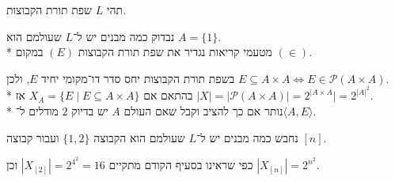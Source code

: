 \question{}
תהי $L$ שפת תורת הקבוצות.

\subquestion{}
נבדוק כמה מבנים יש ל־$L$ שעולמם הוא $A = \{1\}$. \\*
מטעמי קריאות נגדיר את שפת תורת הקבוצות $(E)$ במקום $(\in)$.
\begin{solution}
	בשפת תורת הקבוצות יחס סדר דו־מקומי יחיד $E$, ולכן $E \subseteq A \times A \iff E \in \mathcal{P}(A \times A)$. \\*
בהתאם אם $X_A = \{ E \mid E \subseteq A \times A \}$ אז $|X| = |\mathcal{P}(A \times A)| = 2^{|A \times A}| = 2^{{|A|}^2}$. \\*
	נותר אם כך להציב וקבל שאם העולם $A$ יש בדיוק $2$ מודלים ל־$\langle A, E \rangle$.
\end{solution}

\subquestion{}
נחבש כמה מבנים יש ל־$L$ שעולמם הוא הקבוצה $\{1, 2\}$ ועבור קבוצה $[n]$.
\begin{solution}
	כפי שראינו בסעיף הקודם מתקיים $|X_{[2]}| = 2^{4^2} = 16$ וכן $|X_{[n]}| = 2^{n^2}$.
\end{solution}



